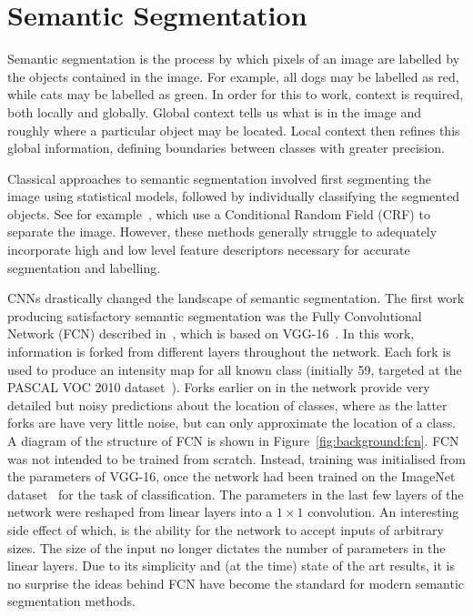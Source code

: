 \section{Semantic Segmentation}

Semantic segmentation is the process by which pixels of an image are
labelled by the objects contained in the image. For example, all dogs
may be labelled as red, while cats may be labelled as green. In order
for this to work, context is required, both locally and
globally. Global context tells us what is in the image and roughly
where a particular object may be located. Local context then refines
this global information, defining boundaries between classes with
greater precision.

Classical approaches to semantic segmentation involved first
segmenting the image using statistical models, followed by
individually classifying the segmented objects. See for
example~\cite{arbelaez2012semantic,carreira2012semantic}, which use a
Conditional Random Field (CRF) to separate the image. However, these
methods generally struggle to adequately incorporate high and low
level feature descriptors necessary for accurate segmentation and
labelling.

CNNs drastically changed the landscape of semantic segmentation. The
first work producing satisfactory semantic segmentation was the Fully
Convolutional Network (FCN) described in~\cite{long2015fully}, which
is based on VGG-16~\cite{simonyan2014vgg}. In this work, information
is forked from different layers throughout the network. Each fork is
used to produce an intensity map for all known class (initially 59,
targeted at the PASCAL VOC 2010
dataset~\cite{everingham2010pascal}). Forks earlier on in the network
provide very detailed but noisy predictions about the location of
classes, where as the latter forks are have very little noise, but can
only approximate the location of a class. A diagram of the structure
of FCN is shown in Figure~\ref{fig:background:fcn}. FCN was not
intended to be trained from scratch. Instead, training was initialised
from the parameters of VGG-16, once the network had been trained on
the ImageNet dataset~\cite{krizhevsky2012imagenet} for the task of
classification. The parameters in the last few layers of the network
were reshaped from linear layers into a $1\times 1$ convolution. An
interesting side effect of which, is the ability for the network to
accept inputs of arbitrary sizes. The size of the input no longer
dictates the number of parameters in the linear layers. Due to its
simplicity and (at the time) state of the art results, it is no
surprise the ideas behind FCN have become the standard for modern
semantic segmentation methods.

